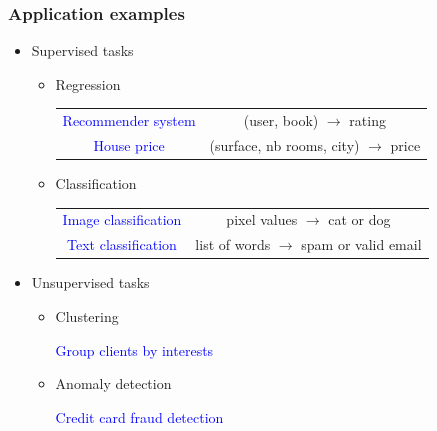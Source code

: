 \documentclass[9pt]{beamer}
\begin{document}
\begin{frame}

  \frametitle{Application examples}

  \begin{itemize}
    \item Supervised tasks
      \begin{itemize}
      \item Regression

        \begin{center}
          \begin{tabular}{cc}
            \textcolor{blue}{Recommender system} & (user, book) $\to$ rating \\[0.2cm]
            \textcolor{blue}{House price} & (surface, nb rooms, city) $\to$ price \\[0.2cm]
        \end{tabular}
        \end{center}

      \item Classification

        \begin{center}
          \begin{tabular}{cc}
            \textcolor{blue}{Image classification} & pixel values $\to$ cat or dog \\[0.2cm]
            \textcolor{blue}{Text classification} & list of words $\to$ spam or valid email
          \end{tabular}
        \end{center}
      \end{itemize}
    \item Unsupervised tasks

      \begin{itemize}
        \item Clustering
          \begin{center}
            \textcolor{blue}{Group clients by interests} \\[.5cm]
          \end{center}
        \item Anomaly detection
          \begin{center}
            \textcolor{blue}{Credit card fraud detection}
          \end{center}
      \end{itemize}
  \end{itemize}

\end{frame}
\end{document}
